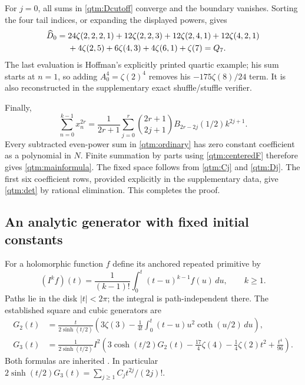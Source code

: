 For $j=0$, all sums in \eqref{qtm:Dcutoff} converge and the
boundary vanishes.  Sorting the four tail indices, or expanding the
displayed powers, gives
\begin{align}\label{qtm:D0MZV}
 \widehat D_0={}&24\zeta(2,2,2,1)+12\zeta(2,2,3)
              +12\zeta(2,4,1)+12\zeta(4,2,1)\notag\\
             &+4\zeta(2,5)+6\zeta(4,3)+4\zeta(6,1)+\zeta(7)
              =Q_7.
\end{align}
The last evaluation is Hoffman's explicitly printed quartic example;
his sum starts at $n=1$, so adding $A_0^4=\zeta(2)^4$ removes
his $-175\zeta(8)/24$ term.  It is also reconstructed in the
supplementary exact shuffle/stuffle verifier.

Finally,
\begin{equation}\label{qtm:centeredF}
 \sum_{n=0}^{k-1}x_n^{2r}
  =\frac1{2r+1}\sum_{j=0}^{r}
   \binom{2r+1}{2j+1}B_{2r-2j}(1/2)k^{2j+1}.
\end{equation}
Every subtracted even-power sum in \eqref{qtm:ordinary} has zero
constant coefficient as a polynomial in $N$.  Finite summation by
parts using \eqref{qtm:centeredF} therefore gives
\eqref{qtm:mainformula}.  The fixed space follows from
\eqref{qtm:Cj} and \eqref{qtm:Dj}.  The first six coefficient rows,
provided explicitly in the supplementary data, give
\eqref{qtm:det} by rational elimination.  This completes the proof.

\subsection{An analytic generator with fixed initial constants}

For a holomorphic function $f$ define its anchored repeated primitive by
\begin{equation}\label{qtm:Ik}
 (I^kf)(t)=\frac1{(k-1)!}\int_0^t(t-u)^{k-1}f(u)\,du,
 \qquad k\ge1.
\end{equation}
Paths lie in the disk $|t|<2\pi$; the integral is path-independent
there.  The established square and cubic generators are
\begin{align}
 G_2(t)&=\frac{t}{2\sinh(t/2)}
 \left(3\zeta(3)-\frac1{4t}
       \int_0^t(t-u)u^2\coth(u/2)\,du\right),
       \label{qtm:G2}\\
 G_3(t)&=\frac1{2\sinh(t/2)}I^2
 \left(3\cosh(t/2)G_2(t)-\frac{17}{4}\zeta(4)
                 -\frac14\zeta(2)t^2+\frac{t^4}{96}\right).
       \label{qtm:G3}
\end{align}
Both formulas are inherited \cite{Square,Reconstruction}.
In particular $2\sinh(t/2)G_3(t)=\sum_{j\ge1}C_jt^{2j}/(2j)!$.

